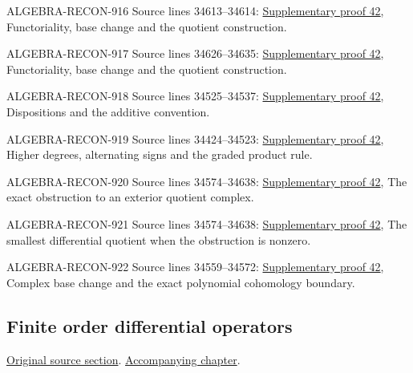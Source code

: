 \begin{AlgebraSourceRoutes}
\item[ALGEBRA-RECON-916] Source lines 34613--34614: \hyperlink{algebra_de_rham_notes_20260928}{Supplementary proof 42}, Functoriality, base change and the quotient construction.
\item[ALGEBRA-RECON-917] Source lines 34626--34635: \hyperlink{algebra_de_rham_notes_20260928}{Supplementary proof 42}, Functoriality, base change and the quotient construction.
\item[ALGEBRA-RECON-918] Source lines 34525--34537: \hyperlink{algebra_de_rham_notes_20260928}{Supplementary proof 42}, Dispositions and the additive convention.
\item[ALGEBRA-RECON-919] Source lines 34424--34523: \hyperlink{algebra_de_rham_notes_20260928}{Supplementary proof 42}, Higher degrees, alternating signs and the graded product rule.
\item[ALGEBRA-RECON-920] Source lines 34574--34638: \hyperlink{algebra_de_rham_notes_20260928}{Supplementary proof 42}, The exact obstruction to an exterior quotient complex.
\item[ALGEBRA-RECON-921] Source lines 34574--34638: \hyperlink{algebra_de_rham_notes_20260928}{Supplementary proof 42}, The smallest differential quotient when the obstruction is nonzero.
\item[ALGEBRA-RECON-922] Source lines 34559--34572: \hyperlink{algebra_de_rham_notes_20260928}{Supplementary proof 42}, Complex base change and the exact polynomial cohomology boundary.
\end{AlgebraSourceRoutes}

\subsection{Finite order differential operators}
\hypertarget{algebra-source-section-differential-operators}{}
\noindent\href{https://github.com/stacks/stacks-project/blob/a04446e57ec1fbc252a871afcec7752fb2807b14/algebra.tex\#L34651}{Original source section}. \href{algebra.pdf\#nameddest=section-differential-operators}{Accompanying chapter}.

